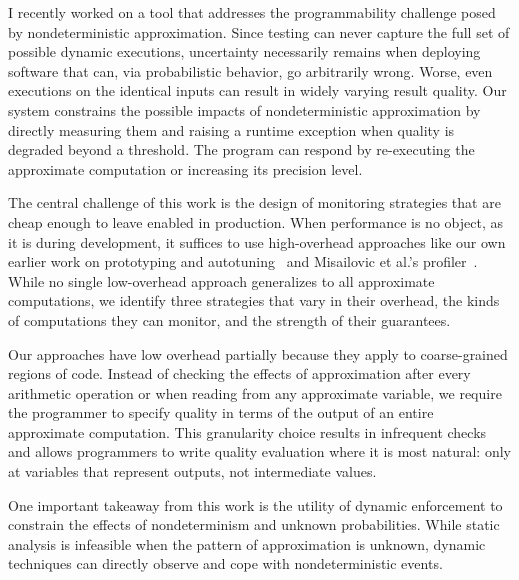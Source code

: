I recently worked on a tool that addresses the programmability challenge posed
by nondeterministic approximation. Since testing can never capture
the full set of possible dynamic executions, uncertainty necessarily remains
when deploying software that can, via probabilistic behavior, go arbitrarily
wrong. Worse, even executions on the identical inputs can result in
widely varying result quality. Our system constrains the possible impacts of
nondeterministic approximation by directly measuring them and raising a
runtime exception when quality is degraded beyond a threshold. The program can
respond by re-executing the approximate computation or increasing its
precision level.

The central challenge of this work is the design of monitoring strategies that
are cheap enough to leave enabled in production. When performance is no object,
as it is during development, it suffices to use high-overhead approaches like our
own earlier work on prototyping and autotuning~\cite{enercaml} and Misailovic
et al.'s profiler~\cite{qosprof}.
While no single low-overhead approach
generalizes to all approximate computations, we identify three strategies that
vary in their overhead, the kinds of computations they can monitor, and the
strength of their guarantees.

Our approaches have low overhead partially because they apply to
coarse-grained regions of code. Instead of checking the effects of
approximation after every arithmetic operation or when reading from any
approximate variable, we require the programmer to specify quality in terms of
the output of an entire approximate computation. This granularity choice
results in infrequent checks and allows programmers to write quality
evaluation where it is most natural: only at variables that represent outputs, not intermediate
values.

One important takeaway from this work is the utility of dynamic enforcement
to constrain the effects of nondeterminism and unknown probabilities. While
static analysis is infeasible when the pattern of approximation is unknown,
dynamic techniques can directly observe and cope with nondeterministic events.
